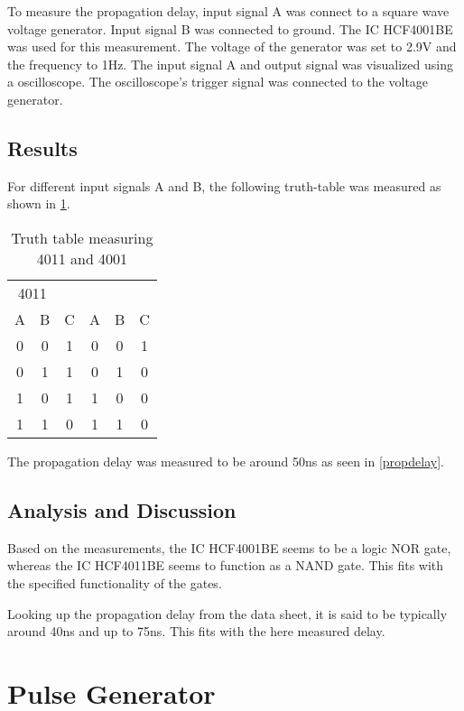\documentclass[journal]{IEEEtran}
\begin{document}
To measure the propagation delay, input signal A was connect to a square wave
voltage generator. Input signal B was connected to ground. The IC HCF4001BE
was used for this measurement. The voltage of the generator was set to 2.9V and
the frequency to 1Hz. The input signal A and output signal was visualized using
a oscilloscope. The oscilloscope's trigger signal was connected to the voltage
generator.

\subsection{Results}

For different input signals A and B, the following truth-table was measured as
shown in \ref{truthtable}.

\begin{table}
\centering
\begin{tabular}{c c | c || c c | c}
  \multicolumn{2}{c}{4011}
  \multicolumn{5}{c}{4001} \\
  A & B & C & A & B & C \\ \hline
  0 & 0 & 1 & 0 & 0 & 1 \\
  0 & 1 & 1 & 0 & 1 & 0 \\
  1 & 0 & 1 & 1 & 0 & 0 \\
  1 & 1 & 0 & 1 & 1 & 0 \\ 
\end{tabular}
\label{truthtable}
\caption{Truth table measuring 4011 and 4001}
\end{table}

The propagation delay was measured to be around 50ns as seen in
\ref{propdelay}.

\subsection{Analysis and Discussion}

Based on the measurements, the IC HCF4001BE seems to be a logic NOR gate,
whereas the IC HCF4011BE seems to function as a NAND gate. This fits with the
specified functionality of the gates.

Looking up the propagation delay from the data sheet, it is said to be typically
around 40ns and up to 75ns. This fits with the here measured delay.

\section{Pulse Generator}
\end{document}
